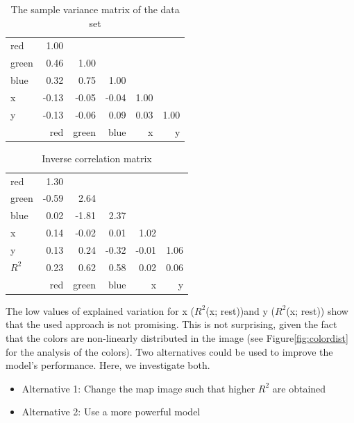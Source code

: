 \documentclass{article}
\begin{document}
\begin{table}[h]
  \centering
  \begin{tabular}{l|rrrrr}
    red   & 1.00  &       &       &      &      \\
    green & 0.46  & 1.00  &       &      &      \\
    blue  & 0.32  & 0.75  & 1.00  &      &      \\
    x     & -0.13 & -0.05 & -0.04 & 1.00 &      \\
    y     & -0.13 & -0.06 & 0.09  & 0.03 & 1.00 \\
    \midrule
          & red   & green & blue  & x    & y
  \end{tabular}
  \caption{The sample variance matrix of the data set}
\end{table}

\begin{table}                                   
\centering                                      
\begin{tabular}{l|rrrrr}                    
    red   & 1.30  &       &       &       &      \\  
    green & -0.59 & 2.64  &       &       &      \\
    blue  & 0.02  & -1.81 & 2.37  &       &      \\ 
    x     & 0.14  & -0.02 & 0.01  & 1.02  &      \\ 
    y     & 0.13  & 0.24  & -0.32 & -0.01 & 1.06 \\ 
  \midrule
  $R^2$   & 0.23  & 0.62  & 0.58  & 0.02  & 0.06 \\
  \midrule
          & red   & green & blue  & x     & y
\end{tabular}                                   
\caption{Inverse correlation matrix}                        
\label{table:MyTableLabel}                      
\end{table} 

The low values of explained variation for x ($R^2$(x; rest))and y
($R^2$(x; rest)) show that the used approach is not promising. This is
not surprising, given the fact that the colors are non-linearly
distributed in the image (see Figure\ref{fig:colordist} for the
analysis of the colors). Two alternatives could be used to improve the
model's performance. Here, we investigate both.
\begin{itemize}
\item Alternative 1: Change the map image such that higher $R^2$ are
  obtained
\item Alternative 2: Use a more powerful model
\end{itemize}
\end{document}
